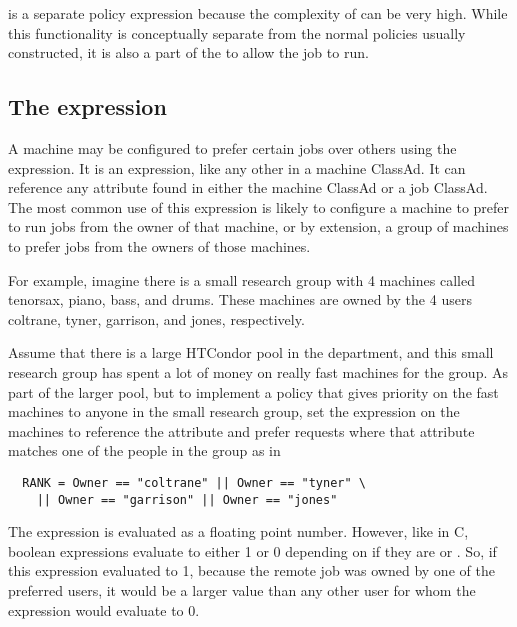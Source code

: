 is a separate policy expression because the complexity of
 can be very high.
While this
functionality is conceptually separate from the normal 
policies usually constructed, it is also a part of the 
to allow the job to run.

\subsection{\label{sec:Rank-Expression}
The  expression}

A machine may be configured to prefer certain jobs over others
using the  expression.
It is an
expression, like any other in a machine ClassAd.
It can
reference any attribute found in either the machine ClassAd or a job ClassAd.
The most common use of this expression is likely to configure a
machine to prefer to run jobs from the owner of that machine, or by
extension, a group of machines to prefer jobs from the owners of those
machines.

For example, imagine there is a small research group with 4 machines
called tenorsax, piano, bass, and drums.
These machines are owned by the 4 users
coltrane, tyner, garrison, and jones,
respectively.  

Assume that there is a large HTCondor pool in the department,
and this small research group has spent a lot of money on really fast machines 
for the group.
As part of the larger pool, 
but to implement a policy that gives priority on the fast machines to
anyone in the small research group,
set the 
expression on the machines to reference the  attribute and
prefer requests where that attribute matches one of the people in the
group as in
\begin{verbatim}
  RANK = Owner == "coltrane" || Owner == "tyner" \
    || Owner == "garrison" || Owner == "jones"
\end{verbatim}

The  expression is evaluated as a floating point number.
However, like in C, boolean expressions evaluate to either 1 or 0
depending on if they are \Expr{True} or \Expr{False}.
So, if this expression
evaluated to 1, 
because the remote job was owned by one of the preferred users,
it would be a larger value than any other
user for whom the expression would evaluate to 0.

